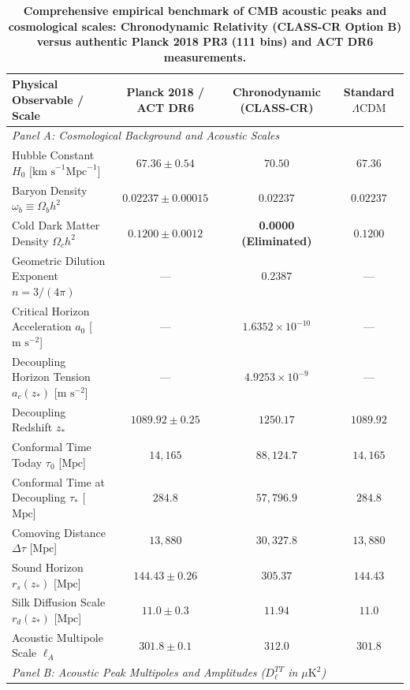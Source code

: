 \documentclass[aps,prd,reprint,superscriptaddress,nofootinbib,twocolumn]{revtex4-2}
\begin{document}
\begin{table}[t]
\caption{\textbf{Comprehensive empirical benchmark of CMB acoustic peaks and cosmological scales: Chronodynamic Relativity (CLASS-CR Option B) versus authentic Planck 2018 PR3 (111 bins) and ACT DR6 measurements.}}
\label{tab:cmb_benchmark}
\centering
\begin{ruledtabular}
\footnotesize
\setlength{\tabcolsep}{3.2pt}
\begin{tabular}{lccc}
\textbf{Physical Observable / Scale} & \textbf{Planck 2018 / ACT DR6} & \textbf{Chronodynamic (CLASS-CR)} & \textbf{Standard $\Lambda\text{CDM}$} \\
\midrule
\multicolumn{4}{l}{\textit{Panel A: Cosmological Background and Acoustic Scales}} \\
Hubble Constant $H_0$ [$\text{km s}^{-1}\text{Mpc}^{-1}$] & $67.36 \pm 0.54$ & $70.50$ & $67.36$ \\
Baryon Density $\omega_b \equiv \Omega_b h^2$ & $0.02237 \pm 0.00015$ & $0.02237$ & $0.02237$ \\
Cold Dark Matter Density $\Omega_c h^2$ & $0.1200 \pm 0.0012$ & \textbf{0.0000 (Eliminated)} & $0.1200$ \\
Geometric Dilution Exponent $n = 3/(4\pi)$ & --- & $0.2387$ & --- \\
Critical Horizon Acceleration $a_0$ [$\text{m s}^{-2}$] & --- & $1.6352 \times 10^{-10}$ & --- \\
Decoupling Horizon Tension $a_c(z_*)$ [$\text{m s}^{-2}$] & --- & $4.9253 \times 10^{-9}$ & --- \\
Decoupling Redshift $z_*$ & $1089.92 \pm 0.25$ & $1250.17$ & $1089.92$ \\
Conformal Time Today $\tau_0$ [$\text{Mpc}$] & $14{,}165$ & $88{,}124.7$ & $14{,}165$ \\
Conformal Time at Decoupling $\tau_*$ [$\text{Mpc}$] & $284.8$ & $57{,}796.9$ & $284.8$ \\
Comoving Distance $\Delta\tau$ [$\text{Mpc}$] & $13{,}880$ & $30{,}327.8$ & $13{,}880$ \\
Sound Horizon $r_s(z_*)$ [$\text{Mpc}$] & $144.43 \pm 0.26$ & $305.37$ & $144.43$ \\
Silk Diffusion Scale $r_d(z_*)$ [$\text{Mpc}$] & $11.0 \pm 0.3$ & $11.94$ & $11.0$ \\
Acoustic Multipole Scale $\ell_A$ & $301.8 \pm 0.1$ & $312.0$ & $301.8$ \\
\midrule
\multicolumn{4}{l}{\textit{Panel B: Acoustic Peak Multipoles and Amplitudes ($D_\ell^{TT}$ in $\mu\text{K}^2$)}} \\

\end{tabular}
\end{ruledtabular}
\end{table}
\end{document}
